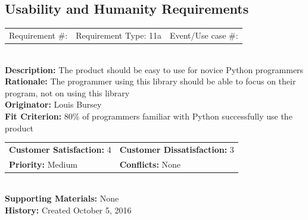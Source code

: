 \documentclass[12pt, titlepage]{article}
\begin{document}
\subsection{Usability and Humanity Requirements}

%
%
\begin{reqbox}
\begin{tabular}{ccc}
Requirement \#: & Requirement Type: 11a & Event/Use case \#: \\
\end{tabular} \\
\textbf{Description:} The product should be easy to use for novice Python programmers \\
\textbf{Rationale:} The programmer using this library should be able to focus on their program, not on using this library \\
\textbf{Originator:} Louis Bursey\\
\textbf{Fit Criterion:} 80\% of programmers familiar with Python successfully use the product  \\
\begin{tabular}{ll}
\textbf{Customer Satisfaction:} 4 & \textbf{Customer Dissatisfaction:} 3 \\
\textbf{Priority:} Medium & \textbf{Conflicts:} None\\
\end{tabular} \\
\textbf{Supporting Materials:} None \\
\textbf{History:} Created October 5, 2016
\end{reqbox}
\end{document}
